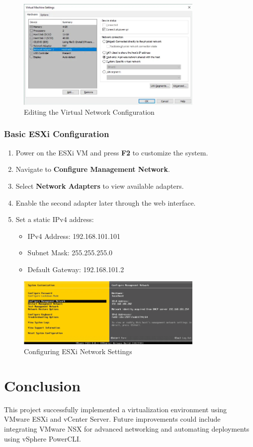 \documentclass[a4paper,12pt]{article}
\begin{document}
\begin{figure}[H]
    \centering
    \includegraphics[width=0.8\textwidth]{images/network_adapter.png}  %
    \caption{Editing the Virtual Network Configuration}
\end{figure}



\subsubsection{Basic ESXi Configuration}
\begin{enumerate}
    \item Power on the ESXi VM and press \textbf{F2} to customize the system.
    \item Navigate to \textbf{Configure Management Network}.
    \item Select \textbf{Network Adapters} to view available adapters.
    \item Enable the second adapter later through the web interface.
    \item Set a static IPv4 address:
    \begin{itemize}
        \item IPv4 Address: 192.168.101.101
        \item Subnet Mask: 255.255.255.0
        \item Default Gateway: 192.168.101.2
    \end{itemize}
\end{enumerate}
\begin{figure}[H]
    \centering
    \includegraphics[width=0.8\textwidth]{images/Configure Management Network.png}  %
    \caption{Configuring ESXi Network Settings}
\end{figure}

\section{Conclusion}
This project successfully implemented a virtualization environment using VMware ESXi and vCenter Server. Future improvements could include integrating VMware NSX for advanced networking and automating deployments using vSphere PowerCLI.
\end{document}

